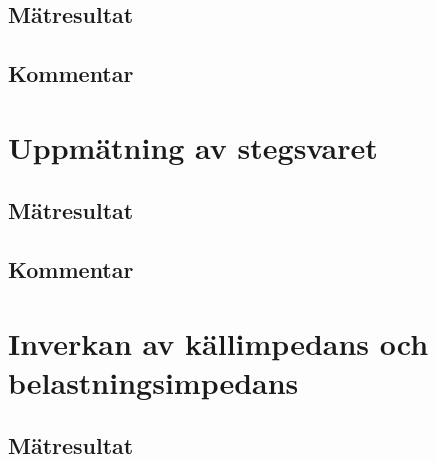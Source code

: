 \documentclass[11pt,a4paper]{article}
\begin{document}
\subsection{Mätresultat}\label{}

\subsection{Kommentar}\label{}


\section{Uppmätning av stegsvaret}\label{}

\subsection{Mätresultat}\label{}

\subsection{Kommentar}\label{}


\section{Inverkan av källimpedans och belastningsimpedans}\label{}

\subsection{Mätresultat}\label{}
\end{document}
